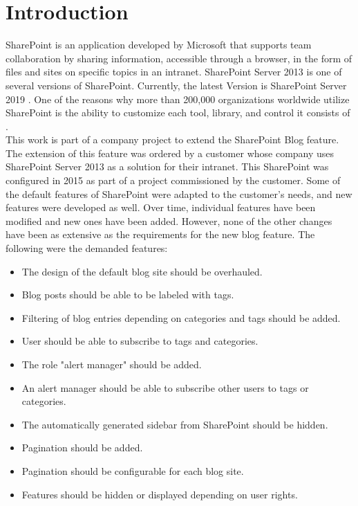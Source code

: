 \documentclass[Bachelor,BIF,english]{twbook}
\begin{document}
\chapter{Introduction}
SharePoint \cite{SharePoint} is an application developed by Microsoft that supports team collaboration by sharing information, accessible through a browser, in the form of files and sites on specific topics in an intranet. SharePoint Server 2013 is one of several versions of SharePoint. Currently, the latest Version is SharePoint Server 2019 \cite{SharePoint}. One of the reasons why more than 200,000 organizations worldwide utilize SharePoint is the ability to customize each tool, library, and control it consists of \cite{SharePoint} \cite{SharePointDevRef}.
\\[\baselineskip]
This work is part of a company project to extend the SharePoint Blog feature. The extension of this feature was ordered by a customer whose company uses SharePoint Server 2013 as a solution for their intranet. This SharePoint was configured in 2015 as part of a project commissioned by the customer. Some of the default features of SharePoint were adapted to the customer's needs, and new features were developed as well. Over time, individual features have been modified and new ones have been added. However, none of the other changes have been as extensive as the requirements for the new blog feature. The following were the demanded features: 
\begin{itemize}
\item The design of the default blog site should be overhauled.
\item Blog posts should be able to be labeled with tags. 
\item Filtering of blog entries depending on categories and tags should be added.
\item User should be able to subscribe to tags and categories. 
\item The role "alert manager" should be added.
\item An alert manager should be able to subscribe other users to tags or categories.
\item The automatically generated sidebar from SharePoint should be hidden. 
\item Pagination should be added.
\item Pagination should be configurable for each blog site.
\item Features should be hidden or displayed depending on user rights.
\end{itemize}
\end{document}
